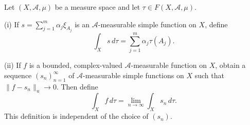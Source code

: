 Let $(X, \mathcal{A}, \mu)$ be a measure space and let $\tau \in F(X, \mathcal{A}, \mu)$.

(i) If $s = \sum_{j=1}^{m} \alpha_j \xi_{A_j}$ is an $\mathcal{A}$-measurable simple function on $X$, define
$$\int_X s \, d\tau = \sum_{j=1}^{m} \alpha_j \tau(A_j).$$

(ii) If $f$ is a bounded, complex-valued $\mathcal{A}$-measurable function on $X$, obtain a sequence $(s_n)_{n=1}^{\infty}$ of $\mathcal{A}$-measurable simple functions on $X$ such that $\|f - s_n\|_u \to 0$. Then define
$$\int_X f \, d\tau = \lim_{n \to \infty} \int_X s_n \, d\tau.$$
This definition is independent of the choice of $(s_n)$.
